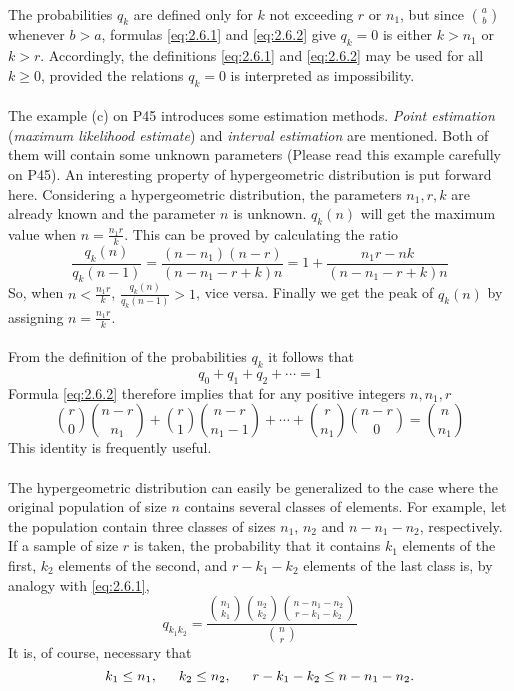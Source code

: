 \documentclass{article}
\numberwithin{equation}{subsection}
\begin{document}
			\paragraph{} The probabilities $q_k$ are defined only for $k$ not exceeding $r$ or $n_1$, but since ${a\choose b}$ whenever $b>a$, formulas \eqref{eq:2.6.1} and \eqref{eq:2.6.2} give $q_k=0$ is either $k>n_1$ or $k>r$. Accordingly, the definitions \eqref{eq:2.6.1} and \eqref{eq:2.6.2} may be used for all $k\geq0$, provided the relations $q_k=0$ is interpreted as impossibility.
			\paragraph{} The example (c) on P45 introduces some estimation methods. \textit{Point estimation} (\textit{maximum likelihood estimate}) and \textit{interval estimation} are  mentioned. Both of them will contain some unknown parameters (Please read this example carefully on P45). An interesting property of hypergeometric distribution is put forward here. Considering a hypergeometric distribution, the parameters $n_1, r, k$ are already known and the parameter $n$ is unknown. $q_k(n)$ will get the maximum value when $n=\frac{n_1r}{k}$. This can be proved by calculating the ratio
			\begin{equation}
				\label{eq:2.6.3}
				\frac{q_k(n)}{q_k(n-1)}=\frac{(n-n_1)(n-r)}{(n-n_1-r+k)n}=1+\frac{n_1r-nk}{(n-n_1-r+k)n}
			\end{equation}
			So, when $n<\frac{n_1r}{k}$, $\frac{q_k(n)}{q_k(n-1)} > 1$, vice versa. Finally we get the peak of $q_k(n)$ by assigning $n=\frac{n_1r}{k}$. 
			\paragraph{} From the definition of the probabilities $q_k$ it follows that $$q_0+q_1+q_2+\cdots=1$$ Formula \eqref{eq:2.6.2} therefore implies that for any positive integers $n,n_1,r$
			\begin{equation}
				\label{eq:2.6.4}
				{r \choose 0}{n-r\choose n_1} + {r \choose 1}{n-r \choose n_1-1} + \cdots + {r\choose n_1}{n-r\choose 0} = {n\choose n_1}
			\end{equation}
			This identity is frequently useful.
			\paragraph{} The hypergeometric distribution can easily be generalized to the case where the original population of size $n$ contains several classes of elements. For example, let the population contain three classes of sizes $n_1$, $n_2$ and $n-n_1-n_2$, respectively. If a sample of size $r$ is taken, the probability that it contains $k_1$ elements of the first, $k_2$ elements of the second, and $r-k_1-k_2$ elements of the last class is, by analogy with \eqref{eq:2.6.1}, 
			\begin{equation}
				\label{eq:2.6.5}
				q_{k_1k_2} = \frac{{n_1 \choose k_1}{n_2\choose k_2}{n-n_1-n_2\choose r-k_1-k_2}}{{n \choose r}}
			\end{equation}
			It is, of course, necessary that
			$$k_1\leq n_1,\indent k_2\leq n_2, \indent r-k_1-k_2\leq n-n_1-n_2.$$
\end{document}
